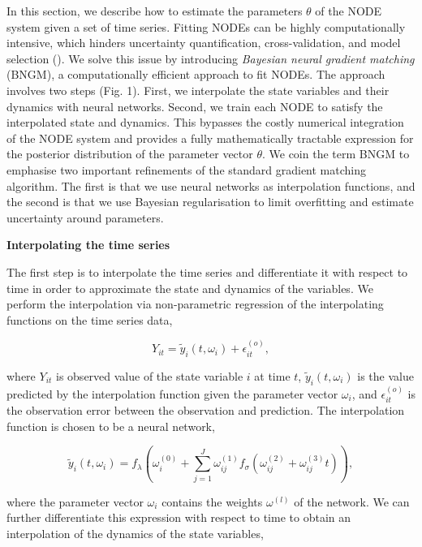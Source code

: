 \documentclass[11pt, oneside]{article}
\begin{document}
In this section, we describe how to estimate the parameters $\theta$ of the NODE system given a set of time series. 
Fitting NODEs can be highly computationally intensive, which hinders uncertainty quantification, cross-validation, and model selection (\cite{Bonnaffe2021a}).
We solve this issue by introducing \textit{Bayesian neural gradient matching} (BNGM), a computationally efficient approach to fit NODEs.
The approach involves two steps (Fig. 1).
First, we interpolate the state variables and their dynamics with neural networks.
Second, we train each NODE to satisfy the interpolated state and dynamics.
This bypasses the costly numerical integration of the NODE system and provides a fully mathematically tractable expression for the posterior distribution of the parameter vector $\theta$. 
We coin the term BNGM to emphasise two important refinements of the standard gradient matching algorithm. 
The first is that we use neural networks as interpolation functions, and the second is that we use Bayesian regularisation to limit overfitting and estimate uncertainty around parameters.

\textbf{Interpolating the time series}

The first step is to interpolate the time series and differentiate it with respect to time in order to approximate the state and dynamics of the variables.
We perform the interpolation via non-parametric regression of the interpolating functions on the time series data,

\vspace{-0.5cm}
\begin{equation}
    Y_{it} = \tilde{y}_i(t,\omega_i) + \epsilon^{(o)}_{it},
\end{equation}

where $Y_{it}$ is observed value of the state variable $i$ at time $t$, $\tilde{y}_i(t,\omega_i)$ is the value predicted by the interpolation function given the parameter vector $\omega_i$, and $\epsilon^{(o)}_{it}$ is the observation error between the observation and prediction. 
The interpolation function is chosen to be a neural network,

\vspace{-0.5cm}
\begin{equation}
    \tilde{y}_i (t,\omega_i) = f_\lambda \left( \omega_i^{(0)} + \sum_{j=1}^{J} \omega^{(1)}_{ij} f_\sigma \left( \omega^{(2)}_{ij} + \omega^{(3)}_{ij} t \right) \right),
\end{equation}

where the parameter vector $\omega_i$ contains the weights $\omega^{(l)}$ of the network.
We can further differentiate this expression with respect to time to obtain an interpolation of the dynamics of the state variables, 
\end{document}
